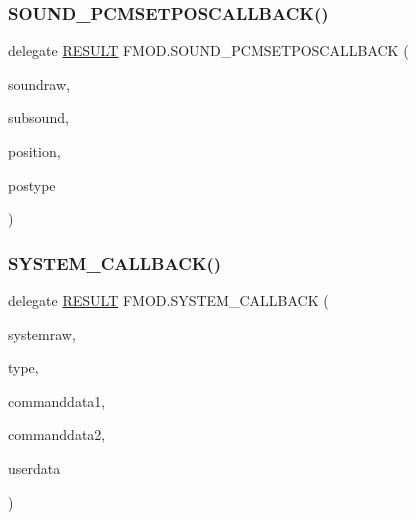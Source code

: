 \subsubsection{\texorpdfstring{S\+O\+U\+N\+D\+\_\+\+P\+C\+M\+S\+E\+T\+P\+O\+S\+C\+A\+L\+L\+B\+A\+C\+K()}{SOUND\_PCMSETPOSCALLBACK()}}
{\footnotesize\ttfamily delegate \hyperlink{namespace_f_m_o_d_a305d1176ef3f8c8815861a60407ac33d}{R\+E\+S\+U\+LT} F\+M\+O\+D.\+S\+O\+U\+N\+D\+\_\+\+P\+C\+M\+S\+E\+T\+P\+O\+S\+C\+A\+L\+L\+B\+A\+CK (\begin{DoxyParamCaption}\item[{Int\+Ptr}]{soundraw,  }\item[{int}]{subsound,  }\item[{uint}]{position,  }\item[{\hyperlink{namespace_f_m_o_d_aff20975332f93ff2180d2681cb43929f}{T\+I\+M\+E\+U\+N\+IT}}]{postype }\end{DoxyParamCaption})}

\mbox{\label{namespace_f_m_o_d_aa2778e41871e1fdfe9ecae550d4a45eb}} 
\subsubsection{\texorpdfstring{S\+Y\+S\+T\+E\+M\+\_\+\+C\+A\+L\+L\+B\+A\+C\+K()}{SYSTEM\_CALLBACK()}}
{\footnotesize\ttfamily delegate \hyperlink{namespace_f_m_o_d_a305d1176ef3f8c8815861a60407ac33d}{R\+E\+S\+U\+LT} F\+M\+O\+D.\+S\+Y\+S\+T\+E\+M\+\_\+\+C\+A\+L\+L\+B\+A\+CK (\begin{DoxyParamCaption}\item[{Int\+Ptr}]{systemraw,  }\item[{\hyperlink{namespace_f_m_o_d_aa5c808c3670f64c2b51ff4f216362a63}{S\+Y\+S\+T\+E\+M\+\_\+\+C\+A\+L\+L\+B\+A\+C\+K\+\_\+\+T\+Y\+PE}}]{type,  }\item[{Int\+Ptr}]{commanddata1,  }\item[{Int\+Ptr}]{commanddata2,  }\item[{Int\+Ptr}]{userdata }\end{DoxyParamCaption})}


